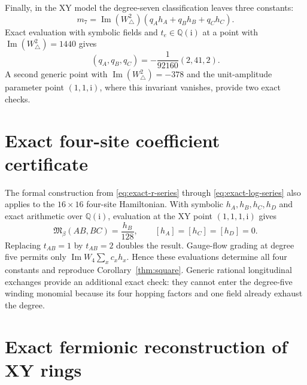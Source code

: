 \documentclass[aps,prb,preprint,nofootinbib,longbibliography]{revtex4-2}
\newcommand{\Mmod}{\mathfrak{M}}
\newcommand{\ii}{\mathrm{i}}
\begin{document}
Finally, in the XY model the degree-seven classification leaves
three constants:
\begin{equation}
 m_7=\operatorname{Im}(W_\triangle^2)
 (q_Ah_A+q_Bh_B+q_Ch_C).
 \label{eq:m7-ansatz}
\end{equation}
Exact evaluation with symbolic fields and $t_e\in\mathbb Q(\ii)$ at a point with
$\operatorname{Im}(W_\triangle^2)=1440$ gives
\begin{equation}
 (q_A,q_B,q_C)=-\frac1{92160}(2,41,2).
 \label{eq:m7-coefficients}
\end{equation}
A second generic point with
$\operatorname{Im}(W_\triangle^2)=-378$ and the unit-amplitude parameter
point $(1,1,\ii)$, where this invariant vanishes, provide two exact checks.

\section{Exact four-site coefficient certificate}
\label{app:ring-certificate}

The formal construction from \eqref{eq:exact-r-series} through
\eqref{eq:exact-log-series} also applies to the $16\times16$ four-site
Hamiltonian.  With symbolic $h_A,h_B,h_C,h_D$ and exact arithmetic over
$\mathbb Q(\ii)$, evaluation at the XY point $(1,1,1,\ii)$ gives
\begin{equation}
 [\beta^5]\Mmod_\beta(AB,BC)=\frac{h_B}{128},
 \qquad
 [h_A]=[h_C]=[h_D]=0.
 \label{eq:square-certificate}
\end{equation}
Replacing $t_{AB}=1$ by $t_{AB}=2$ doubles the result.  Gauge-flow grading at
degree five permits only
$\operatorname{Im}W_4\sum_xc_xh_x$.  Hence these evaluations determine all
four constants and reproduce Corollary~\ref{thm:square}.  Generic rational
longitudinal exchanges provide an additional exact check: they cannot enter
the degree-five winding monomial because its four hopping factors and one
field already exhaust the degree.

\section{Exact fermionic reconstruction of XY rings}
\label{app:fermionic-ring}
\end{document}
